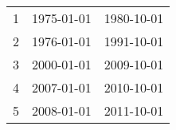 % 
\begin{tabular}{ccc}
  \hline
  \hline
1 & 1975-01-01 & 1980-10-01 \\ 
  2 & 1976-01-01 & 1991-10-01 \\ 
  3 & 2000-01-01 & 2009-10-01 \\ 
  4 & 2007-01-01 & 2010-10-01 \\ 
  5 & 2008-01-01 & 2011-10-01 \\ 
   \hline
\end{tabular}
